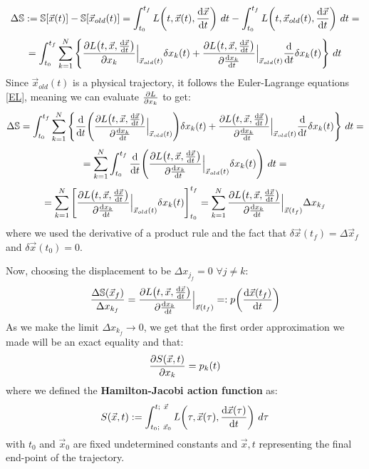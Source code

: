 \documentclass[11pt, a4paper]{article} %
\newcommand{\s}{\mathbb{S}}
\begin{document}
\begin{equation}
\Delta \s:=\s[\vec{x}(t)]-\s[\vec{x}_{old}(t)]=\int_{t_0}^{t_f} L\qty(t, \vec{x}(t), \dv{\vec{x}}{t})\ dt - \int_{t_0}^{t_f} L\qty(t, \vec{x}_{old}(t), \dv{\vec{x}}{t})\ dt=
\end{equation}
$$
= \int_{t_0}^{t_f}  \sum_{k=1}^N \qty{\pdv{L\qty(t, \vec{x}, \dv{\vec{x}}{t})}{x_k}\Big\rvert_{\vec{x}_{old}(t)}\delta x_k(t)+\pdv{L\qty(t, \vec{x}, \dv{\vec{x}}{t})}{\dv{x_k}{t}}\Big\rvert_{\vec{x}_{old}(t)}\dv{}{t}\delta x_k(t)}
\ dt
$$
Since $\vec{x}_{old}(t)$ is a physical trajectory, it follows the Euler-Lagrange equations \eqref{EL}, meaning we can evaluate $\pdv{L}{x_k}$ to get:
\begin{equation}
\Delta \s=\int_{t_0}^{t_f}  \sum_{k=1}^N \qty{\dv{}{t}\qty(\pdv{L\qty(t, \vec{x}, \dv{\vec{x}}{t})}{\dv{x_k}{t}}\Big\rvert_{\vec{x}_{old}(t)})\delta x_k(t)+\pdv{L\qty(t, \vec{x}, \dv{\vec{x}}{t})}{\dv{x_k}{t}}\Big\rvert_{\vec{x}_{old}(t)}\dv{}{t}\delta x_k(t)}
\ dt=
\end{equation}
$$
= \sum_{k=1}^N \int_{t_0}^{t_f} \dv{}{t}\qty(\pdv{L\qty(t, \vec{x}, \dv{\vec{x}}{t})}{\dv{x_k}{t}}\Big\rvert_{\vec{x}_{old}(t)}\delta x_k(t))
\ dt=
$$
$$
=\sum_{k=1}^N\qty[\pdv{L\qty(t, \vec{x}, \dv{\vec{x}}{t})}{\dv{x_k}{t}}\Big\rvert_{\vec{x}_{old}(t)}\delta x_k(t)]^{t_f}_{t_0}=\sum_{k=1}^N\pdv{L\qty(t, \vec{x}, \dv{\vec{x}}{t})}{\dv{x_k}{t}}\Big\rvert_{\vec{x}(t_f)}\Delta x_{k_f}
$$
where we used the derivative of a product rule and the fact that $\delta \vec{x}(t_f)=\Delta \vec{x}_f$ and $\delta \vec{x}(t_0)=0$.

Now, choosing the displacement to be $\Delta x_{j_f}=0$ $\forall j\neq k$:
\begin{equation}
\frac{\Delta \s(\vec{x}_f)}{\Delta x_{k_f}}=\pdv{L\qty(t, \vec{x}, \dv{\vec{x}}{t})}{\dv{x_k}{t}}\Big\rvert_{\vec{x}(t_f)}=:p\qty(\dv{\vec{x}(t_f)}{t})
\end{equation}
As we make the limit $\Delta x_{k_f}\rightarrow 0$, we get that the first order approximation we made will be an exact equality and that:
\begin{equation}\label{momS}
\pdv{S(\vec{x},t)}{x_k}=p_k(t)
\end{equation}
where we defined the {\bf Hamilton-Jacobi action function} as:
\begin{equation}
S(\vec{x},t):=\int_{t_0;\ \vec{x}_0}^{t; \ \vec{x}} L\qty(\tau, \vec{x}(\tau),\dv{\vec{x}(\tau)}{t} )\ d\tau
\end{equation}
with $t_0$ and $\vec{x}_0$ are fixed undetermined constants and $\vec{x},t$ representing the final end-point of the trajectory.
\end{document}
